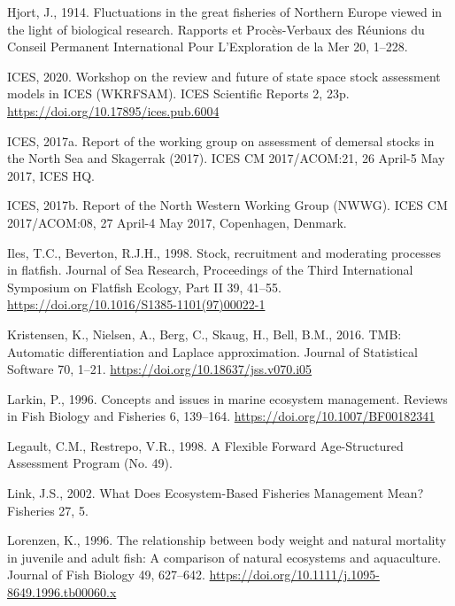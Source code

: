 \documentclass[]{article}
\begin{document}
\leavevmode\hypertarget{ref-hjort1914Fluctuations}{}%
Hjort, J., 1914. Fluctuations in the great fisheries of Northern Europe
viewed in the light of biological research. Rapports et Procès-Verbaux
des Réunions du Conseil Permanent International Pour L'Exploration de la
Mer 20, 1--228.

\leavevmode\hypertarget{ref-ices2020Workshop}{}%
ICES, 2020. Workshop on the review and future of state space stock
assessment models in ICES (WKRFSAM). ICES Scientific Reports 2, 23p.
\url{https://doi.org/10.17895/ices.pub.6004}

\leavevmode\hypertarget{ref-ices2017Report}{}%
ICES, 2017a. Report of the working group on assessment of demersal
stocks in the North Sea and Skagerrak (2017). ICES CM 2017/ACOM:21, 26
April-5 May 2017, ICES HQ.

\leavevmode\hypertarget{ref-ices2017Reporta}{}%
ICES, 2017b. Report of the North Western Working Group (NWWG). ICES CM
2017/ACOM:08, 27 April-4 May 2017, Copenhagen, Denmark.

\leavevmode\hypertarget{ref-iles1998Stock}{}%
Iles, T.C., Beverton, R.J.H., 1998. Stock, recruitment and moderating
processes in flatfish. Journal of Sea Research, Proceedings of the Third
International Symposium on Flatfish Ecology, Part II 39, 41--55.
\url{https://doi.org/10.1016/S1385-1101(97)00022-1}

\leavevmode\hypertarget{ref-kristensen2016TMB}{}%
Kristensen, K., Nielsen, A., Berg, C., Skaug, H., Bell, B.M., 2016. TMB:
Automatic differentiation and Laplace approximation. Journal of
Statistical Software 70, 1--21.
\url{https://doi.org/10.18637/jss.v070.i05}

\leavevmode\hypertarget{ref-larkin1996Concepts}{}%
Larkin, P., 1996. Concepts and issues in marine ecosystem management.
Reviews in Fish Biology and Fisheries 6, 139--164.
\url{https://doi.org/10.1007/BF00182341}

\leavevmode\hypertarget{ref-legault1998Flexible}{}%
Legault, C.M., Restrepo, V.R., 1998. A Flexible Forward Age-Structured
Assessment Program (No. 49).

\leavevmode\hypertarget{ref-link2002What}{}%
Link, J.S., 2002. What Does Ecosystem-Based Fisheries Management Mean?
Fisheries 27, 5.

\leavevmode\hypertarget{ref-lorenzen1996Relationship}{}%
Lorenzen, K., 1996. The relationship between body weight and natural
mortality in juvenile and adult fish: A comparison of natural ecosystems
and aquaculture. Journal of Fish Biology 49, 627--642.
\url{https://doi.org/10.1111/j.1095-8649.1996.tb00060.x}
\end{document}
